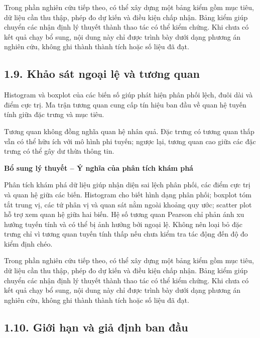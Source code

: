 \documentclass[12pt,a4paper,oneside]{article}
\begin{document}
Trong phần nghiên cứu tiếp theo, có thể xây dựng một bảng kiểm gồm mục tiêu, dữ liệu cần thu thập, phép đo dự kiến và điều kiện chấp nhận. Bảng kiểm giúp chuyển các nhận định lý thuyết thành thao tác có thể kiểm chứng. Khi chưa có kết quả chạy bổ sung, nội dung này chỉ được trình bày dưới dạng phương án nghiên cứu, không ghi thành thành tích hoặc số liệu đã đạt.\par

\subsection*{1.9. Khảo sát ngoại lệ và tương quan}

Histogram và boxplot của các biến số giúp phát hiện phân phối lệch, đuôi
dài và điểm cực trị. Ma trận tương quan cung cấp tín hiệu ban đầu về
quan hệ tuyến tính giữa đặc trưng và mục tiêu.

Tương quan không đồng nghĩa quan hệ nhân quả. Đặc trưng có tương quan
thấp vẫn có thể hữu ích với mô hình phi tuyến; ngược lại, tương quan cao
giữa các đặc trưng có thể gây dư thừa thông tin.


\par\noindent\textbf{Bổ sung lý thuyết -- Ý nghĩa của phân tích khám phá}\par
Phân tích khám phá dữ liệu giúp nhận diện sai lệch phân phối, các điểm cực trị và quan hệ giữa các biến. Histogram cho biết hình dạng phân phối; boxplot tóm tắt trung vị, các tứ phân vị và quan sát nằm ngoài khoảng quy ước; scatter plot hỗ trợ xem quan hệ giữa hai biến. Hệ số tương quan Pearson chỉ phản ánh xu hướng tuyến tính và có thể bị ảnh hưởng bởi ngoại lệ. Không nên loại bỏ đặc trưng chỉ vì tương quan tuyến tính thấp nếu chưa kiểm tra tác động đến độ đo kiểm định chéo.\par

Trong phần nghiên cứu tiếp theo, có thể xây dựng một bảng kiểm gồm mục tiêu, dữ liệu cần thu thập, phép đo dự kiến và điều kiện chấp nhận. Bảng kiểm giúp chuyển các nhận định lý thuyết thành thao tác có thể kiểm chứng. Khi chưa có kết quả chạy bổ sung, nội dung này chỉ được trình bày dưới dạng phương án nghiên cứu, không ghi thành thành tích hoặc số liệu đã đạt.\par

\subsection*{1.10. Giới hạn và giả định ban đầu}
\end{document}
